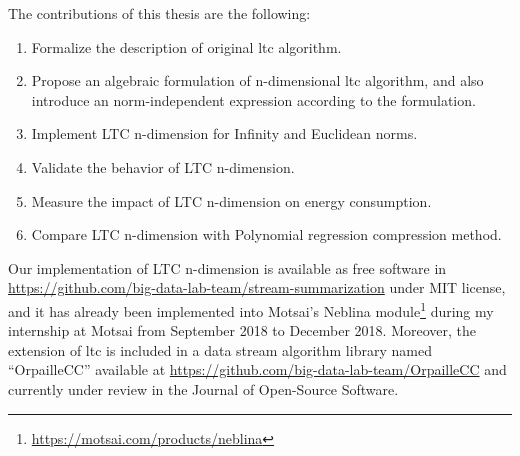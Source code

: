 

The contributions of this thesis are the following:
\begin{enumerate}
  \item Formalize the description of original \acrshort{ltc} algorithm. 
  \item Propose an algebraic formulation of n-dimensional \acrshort{ltc}
  algorithm, and also introduce an norm-independent expression according to the formulation.
  \item Implement LTC n-dimension for Infinity and Euclidean norms.
  \item Validate the behavior of LTC n-dimension.
  \item Measure the impact of LTC n-dimension on energy consumption.
  \item Compare LTC n-dimension with Polynomial regression compression method.
\end{enumerate}

Our implementation of LTC n-dimension is available as free software in
\url{https://github.com/big-data-lab-team/stream-summarization} under MIT
license, and it has already been implemented into Motsai's Neblina
module\footnote{\url{https://motsai.com/products/neblina}} during my internship
at Motsai from September 2018 to December 2018. Moreover, the extension of
\acrshort{ltc} is included in a data stream algorithm library named
``OrpailleCC'' available at
\url{https://github.com/big-data-lab-team/OrpailleCC} and currently under review
in the Journal of Open-Source Software.


